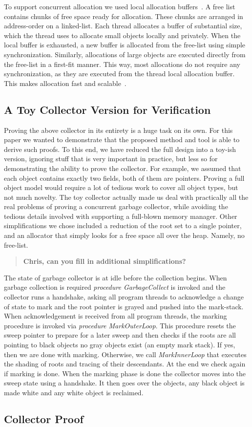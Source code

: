 To support concurrent allocation we used local allocation buffers~\cite{borm02a,bara05}. A free list contains chunks of free space ready for allocation. These chunks are arranged in address-order on a linked-list. Each thread allocates a buffer of substantial size, which the thread uses to allocate small objects locally and privately. When the local buffer is exhausted, a new buffer is allocated from the free-list using simple synchronization. Similarly, allocations of large objects are executed directly from the free-list in a first-fit manner. This way, most allocations do not require any synchronization, as they are executed from the thread local allocation buffer. This makes allocation fast and scalable~\cite{borm02a,bara05}. 

\subsection{A Toy Collector Version for Verification}  
Proving the above collector in its entirety is a huge task on its own. For this paper we wanted to demonstrate that the proposed method and tool is able to derive such proofs. To this end, we have reduced the full design into a toy-ish version, ignoring stuff that is very important in practice, but less so for demonstrating the ability to prove the collector. For example, we assumed that each object contains exactly two fields, both of them are pointers. Proving a full object model would require a lot of tedious work to cover all object types, but not much novelty. The toy collector actually made us deal with practically all the real problems of proving a concurrent garbage collector, while avoiding the tedious details involved with supporting a full-blown memory manager. Other simplifications we chose included a reduction of the root set to a single pointer, and an allocator that simply looks for a free space all over the heap. Namely, no free-list. 

\begin{quote}
{\bf Chris, can you fill in additional simplifications?}
\end{quote}

The state of garbage collector is at {\sc idle} before the collection begins. When garbage collection is required {\em procedure GarbageCollect} is invoked and the collector runs a handshake, asking all program threads to acknowledge a change of state to {\sc mark}
and the root pointer is grayed and pushed into the mark-stack. When acknowledgement is received from all program threads, the marking procedure is invoked via {\em procedure MarkOuterLoop}. This procedure resets the sweep pointer to prepare for a later sweep and then checks if the roots are all pointing to black objects no gray objects exist (an empty mark stack). If yes, then we are done with marking. Otherwise, we call {\em MarkInnerLoop} that executes the shading of roots and tracing of  their descendants. At the end we check again if marking is done. When the marking phase is done the collector moves into the {\sc sweep} state using a handshake. It then goes over the objects, any black object is made white and any white object is reclaimed. 

\subsection{Collector Proof}









